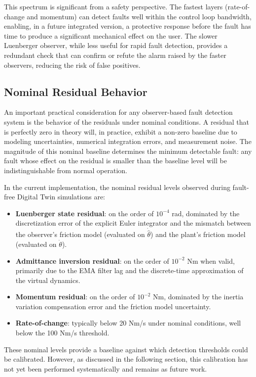This spectrum is significant from a safety perspective. The fastest layers (rate-of-change and momentum) can detect faults well within the control loop bandwidth, enabling, in a future integrated version, a protective response before the fault has time to produce a significant mechanical effect on the user. The slower Luenberger observer, while less useful for rapid fault detection, provides a redundant check that can confirm or refute the alarm raised by the faster observers, reducing the risk of false positives.

\subsection{Nominal Residual Behavior}
An important practical consideration for any observer-based fault detection system is the behavior of the residuals under nominal conditions. A residual that is perfectly zero in theory will, in practice, exhibit a non-zero baseline due to modeling uncertainties, numerical integration errors, and measurement noise. The magnitude of this nominal baseline determines the minimum detectable fault: any fault whose effect on the residual is smaller than the baseline level will be indistinguishable from normal operation.
 
In the current implementation, the nominal residual levels observed during fault-free Digital Twin simulations are:

\begin{itemize}
    \item \textbf{Luenberger state residual}: on the order of $10^{-4}$ rad, dominated by the discretization error of the explicit Euler integrator and the mismatch between the observer's friction model (evaluated on $\dot{\hat{\theta}}$) and the plant's friction model (evaluated on $\dot{\theta}$).
    \item \textbf{Admittance inversion residual}: on the order of $10^{-2}$ Nm when valid, primarily due to the EMA filter lag and the discrete-time approximation of the virtual dynamics.
    \item \textbf{Momentum residual}: on the order of $10^{-2}$ Nm, dominated by the inertia variation compensation error and the friction model uncertainty.
    \item \textbf{Rate-of-change}: typically below 20 Nm/s under nominal conditions, well below the 100 Nm/s threshold.
\end{itemize}

These nominal levels provide a baseline against which detection thresholds could be calibrated. However, as discussed in the following section, this calibration has not yet been performed systematically and remains as future work.


